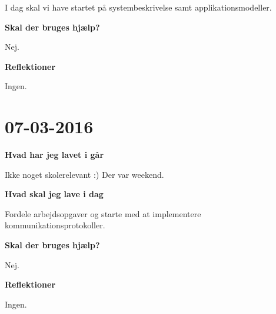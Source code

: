 \documentclass{article}
\begin{document}
	I dag skal vi have startet på systembeskrivelse samt applikationsmodeller.
	
	\textbf{Skal der bruges hjælp?}
	
	Nej.
	
	\textbf{Reflektioner}
	
	Ingen.
	
	\section{07-03-2016}
	
	\textbf{Hvad har jeg lavet i går}
	
	Ikke noget skolerelevant :) Der var weekend.
	
	\textbf{Hvad skal jeg lave i dag}
	
	
	Fordele arbejdsopgaver og starte med at implementere kommunikationsprotokoller.
	
	\textbf{Skal der bruges hjælp?}
	
	Nej.
	
	\textbf{Reflektioner}
	
	Ingen.
\end{document}
